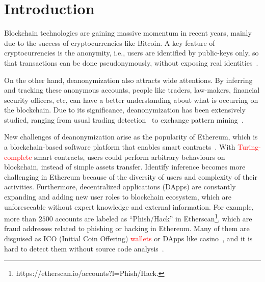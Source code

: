 \section{Introduction}
Blockchain technologies are gaining massive momentum in recent years, mainly due to the success of cryptocurrencies like Bitcoin. A key feature of cryptocurrencies is the anonymity, i.e., users are identified by public-keys only, so that transactions can be done pseudonymously, without exposing real identities~\cite{reid2013analysis}.

On the other hand, deanonymization also attracts wide attentions. By inferring and tracking these anonymous accounts, people like traders, law-makers, financial security officers, etc, can have a better understanding about what is occurring on the blockchain. Due to its significance, deanonymization has been extensively studied, ranging from usual trading detection~\cite{maesa2016analysis} to exchange pattern mining~\cite{ranshous2017exchange}.
 

New challenges of deanonymization arise as the popularity of Ethereum, which is a blockchain-based software platform that enables smart contracts~\cite{buterin2013ethereum}.
With \textcolor{red}{Turing-complete} smart contracts, users could perform arbitrary behaviours on blockchain, instead of simple assets transfer. 
Identify inference becomes more challenging in Ethereum because of the diversity of users and complexity of their activities. Furthermore, decentralized applications (DApps) are constantly expanding and adding new user roles to blockchain ecosystem, which are unforeseeable without expert knowledge and external information.
For example, more than $2500$ accounts are labeled as ``Phish/Hack'' in Etherscan\footnote{https://etherscan.io/accounts?l=Phish/Hack.}, which are fraud addresses related to phishing or hacking in Ethereum. Many of them are disguised as ICO (Initial Coin Offering) \textcolor{red}{wallets} or DApps like casino~\cite{cerchiello2018icos}, and it is hard to detect them without source code analysis~\cite{jiang2018contractfuzzer}. 

